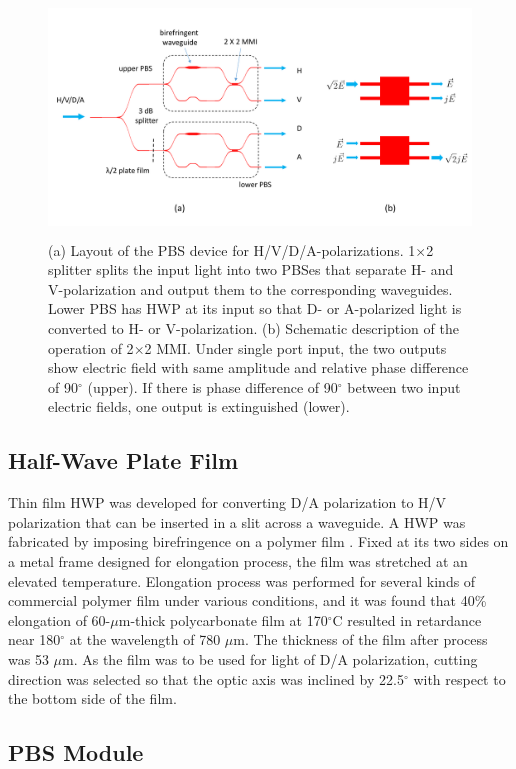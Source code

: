 \documentclass[letterpaper, 10pt]{article}
\begin{document}
\begin{figure}
  \centering
  \includegraphics[height=6.3cm]{./layout}
  \caption{(a) Layout of the PBS device for H/V/D/A-polarizations. 1$\times$2 splitter splits the input light into two PBSes that separate H- and V-polarization and output them to the corresponding waveguides. Lower PBS has HWP at its input so that D- or A-polarized light is converted to H- or V-polarization. (b) Schematic description of the operation of 2$\times$2 MMI. Under single port input, the two outputs show electric field with same amplitude and relative phase difference of 90$^\circ$ (upper). If there is phase difference of 90$^\circ$ between two input electric fields, one output is extinguished (lower).}
  \label{fig:layout}
\end{figure}


\subsection{Half-Wave Plate Film}

Thin film HWP was developed for converting D/A polarization to H/V polarization that can be inserted in a slit across a waveguide.
A HWP was fabricated by imposing birefringence on a polymer film \cite{Ando:1993up}.
Fixed at its two sides on a metal frame designed for elongation process, the film was stretched at an elevated temperature.
Elongation process was performed for several kinds of commercial polymer film under various conditions, and it was found that 40\% elongation of 60-$\mu$m-thick polycarbonate film at 170$^\circ$C resulted in retardance near 180$^\circ$ at the wavelength of 780 $\mu$m.
The thickness of the film after process was 53 $\mu$m.
As the film was to be used for light of D/A polarization, cutting direction was selected so that the optic axis was inclined by 22.5$^\circ$ with respect to the bottom side of the film.

\subsection{PBS Module}
\end{document}

